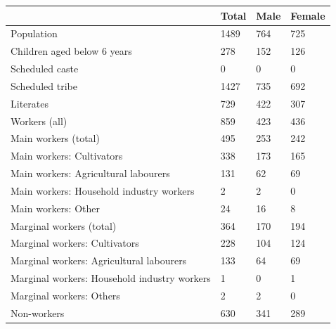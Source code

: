 \documentclass{article}
\begin{document}
\begin{tabular}{llll}
\toprule
 & Total & Male & Female \\
\midrule
Population & 1489 & 764 & 725 \\
Children aged below 6 years & 278 & 152 & 126 \\
Scheduled caste & 0 & 0 & 0 \\
Scheduled tribe & 1427 & 735 & 692 \\
Literates & 729 & 422 & 307 \\
Workers (all) & 859 & 423 & 436 \\
Main workers (total) & 495 & 253 & 242 \\
Main workers: Cultivators & 338 & 173 & 165 \\
Main workers: Agricultural labourers & 131 & 62 & 69 \\
Main workers: Household industry workers & 2 & 2 & 0 \\
Main workers: Other & 24 & 16 & 8 \\
Marginal workers (total) & 364 & 170 & 194 \\
Marginal workers: Cultivators & 228 & 104 & 124 \\
Marginal workers: Agricultural labourers & 133 & 64 & 69 \\
Marginal workers: Household industry workers & 1 & 0 & 1 \\
Marginal workers: Others & 2 & 2 & 0 \\
Non-workers & 630 & 341 & 289 \\
\bottomrule
\end{tabular}
\end{document}
